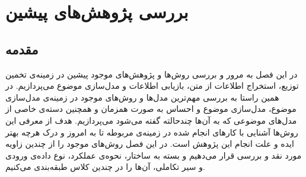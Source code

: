 \chapter{بررسی پژوهش‌های پیشین}
\thispagestyle{empty}
\section{مقدمه}
در این فصل به مرور و بررسی روش‌ها و پژوهش‌های موجود پیشین در زمینه‌ی  تخمین توزیع، 
استخراج اطلاعات
از متن، بازیابی اطلاعات و مدل‌سازی  موضوع می‌پردازیم. در همین راستا  به بررسی‌ مهم‌ترین مدل‌ها و روش‌های موجود در زمینه‌ی مدل‌سازی موضوع، مدل‌سازی موضوع و احساس به صورت همزمان و همچنین دسته‌ی خاصی‌ از مدل‌های موضوعی که به آن‌ها چندحالته گفته می‌‌شود می‌‌پردازیم. هدف از معرفی‌ این روش‌ها آشنایی با کار‌های انجام شده در زمینه‌ی مربوطه تا به امروز و درک هرچه بهتر ایده و علت انجام این پژوهش است. در این فصل روش‌های موجود را از چندین زاویه مورد نقد و بررسی‌ قرار می‌‌دهیم و بسته به ساختار، نحوه‌ی عملکرد، نوع داده‌ی ورودی و سیر تکاملی، آن‌ها را در چندین کلاس طبقه‌بندی می‌‌کنیم.

